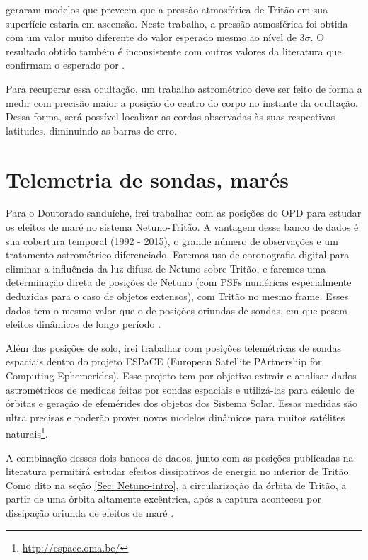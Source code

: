 \documentclass[12pt,a4paper]{monografia}
\begin{document}
\cite{Hansen1992} geraram modelos que preveem que a pressão atmosférica de Tritão em sua superfície estaria em ascensão. Neste trabalho, a pressão atmosférica foi obtida com um valor muito diferente do valor esperado mesmo ao nível de $3\sigma$. O resultado obtido também é inconsistente com outros valores da literatura que confirmam o esperado por \cite{Hansen1992}.

Para recuperar essa ocultação, um trabalho astrométrico deve ser feito de forma a medir com precisão maior a posição do centro do corpo no instante da ocultação. Dessa forma, será possível localizar as cordas observadas às suas respectivas latitudes, diminuindo as barras de erro.


\section{Telemetria de sondas, marés}
\label{Sec: Netuno-mares}

\indent \indent Para o Doutorado sanduíche, irei trabalhar com as posições do OPD para estudar os efeitos de maré no sistema Netuno-Tritão. A vantagem desse banco de dados é sua cobertura temporal (1992 - 2015), o grande número de observações e um tratamento astrométrico diferenciado. Faremos uso de coronografia digital para eliminar a influência da luz difusa de Netuno sobre Tritão, e faremos uma determinação direta de posições de Netuno (com PSFs numéricas especialmente deduzidas para o caso de objetos extensos), com Tritão no mesmo frame. Esses dados tem o mesmo valor que o de posições oriundas de sondas, em que pesem efeitos dinâmicos de longo período \citep{Lainey2012}.

Além das posições de solo, irei trabalhar com posições telemétricas de sondas espaciais dentro do projeto ESPaCE (European Satellite PArtnership for Computing Ephemerides). Esse projeto tem por objetivo extrair e analisar dados astrométricos de medidas feitas por sondas espaciais e utilizá-las para cálculo de órbitas e geração de efemérides dos objetos dos Sistema Solar. Essas medidas são ultra precisas e poderão prover novos modelos dinâmicos para muitos satélites naturais\footnote{\url{http://espace.oma.be/}}.

A combinação desses dois bancos de dados, junto com as posições publicadas na literatura permitirá estudar efeitos dissipativos de energia no interior de Tritão. Como dito na seção \ref{Sec: Netuno-intro}, a circularização da órbita de Tritão, a partir de uma órbita altamente excêntrica, após a captura aconteceu por dissipação oriunda de efeitos de maré \citep{Nimmo2015}.
\end{document}
